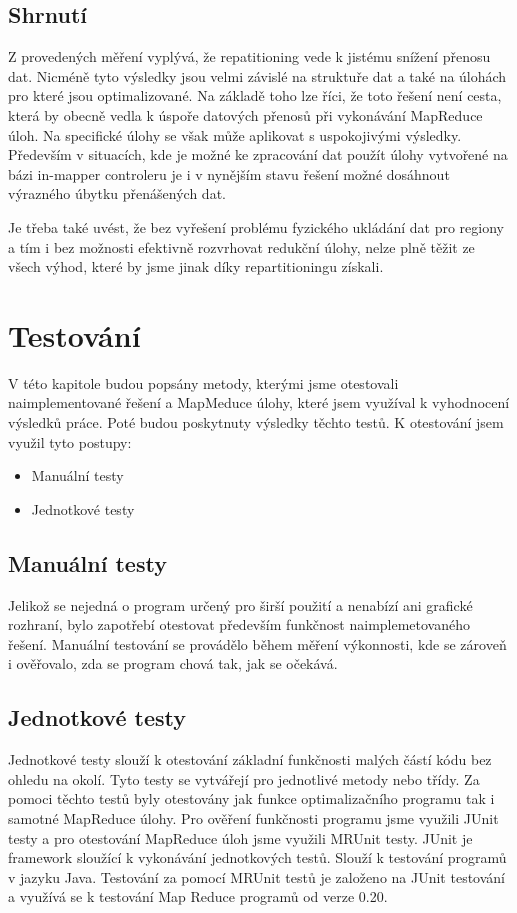 \documentclass[thesis=M,czech]{FITthesis}[2012/06/26]
\begin{document}
\subsection{Shrnutí}
Z provedených měření vyplývá, že repatitioning vede k jistému snížení přenosu dat. Nicméně tyto výsledky jsou velmi závislé na struktuře dat a také na úlohách pro které jsou optimalizované. Na základě toho lze říci, že toto řešení není cesta, která by obecně vedla k úspoře datových přenosů při vykonávání MapReduce úloh. Na specifické úlohy se však může aplikovat s uspokojivými výsledky. Především v situacích, kde je možné ke zpracování dat použít úlohy vytvořené na bázi in-mapper controleru je i v nynějším stavu řešení možné dosáhnout výrazného úbytku přenášených dat.

Je třeba také uvést, že bez vyřešení problému fyzického ukládání dat pro regiony a tím i bez možnosti efektivně rozvrhovat redukční úlohy,  nelze plně těžit ze všech výhod, které by jsme jinak díky repartitioningu získali.




\section{Testování}
V této kapitole budou popsány metody, kterými jsme otestovali naimplementované řešení a MapMeduce úlohy, které jsem využíval k vyhodnocení výsledků práce. Poté budou poskytnuty výsledky těchto testů.
K otestování jsem využil tyto postupy:
\begin{itemize}
	\item Manuální testy
	\item Jednotkové testy

\end{itemize}

\subsection{Manuální testy}
Jelikož se nejedná o program určený pro širší použití a nenabízí ani grafické rozhraní, bylo zapotřebí otestovat především funkčnost naimplemetovaného řešení. Manuální testování se provádělo během měření výkonnosti, kde se zároveň i ověřovalo, zda se program chová tak, jak se očekává.
\subsection{Jednotkové testy}
Jednotkové testy slouží k otestování základní funkčnosti malých částí kódu bez ohledu na okolí. Tyto testy se vytvářejí pro jednotlivé metody nebo třídy. Za pomoci těchto testů byly otestovány jak funkce optimalizačního programu tak i samotné MapReduce úlohy.  Pro ověření funkčnosti programu jsme využili JUnit testy a pro otestování MapReduce úloh jsme využili MRUnit testy. JUnit je framework sloužící k vykonávání jednotkových testů. Slouží k testování programů v jazyku Java. Testování za pomocí MRUnit testů je založeno na JUnit testování a využívá se k testování Map Reduce programů od verze 0.20. 
\end{document}
